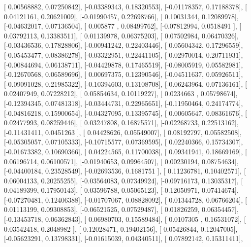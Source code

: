 \documentclass{article}
\begin{document}
       [ 0.00568882,  0.07250842],
       [-0.03389343,  0.18320553],
       [-0.01178357,  0.17188378],
       [ 0.04121161,  0.20621009],
       [-0.01990457,  0.22698766],
       [ 0.10031344,  0.12089978],
       [-0.04632017,  0.07136504],
       [ 0.005877  ,  0.08499762],
       [-0.07812994,  0.0518491 ],
       [ 0.03792113,  0.13383511],
       [ 0.01139978,  0.06375203],
       [ 0.07502984,  0.06470326],
       [-0.03436536,  0.17828806],
       [-0.00941242,  0.22403446],
       [ 0.05604342,  0.17296559],
       [-0.05453477,  0.08386278],
       [-0.03322951,  0.22441105],
       [ 0.02970014,  0.20711931],
       [-0.00844694,  0.06138711],
       [-0.04429878,  0.17465519],
       [-0.08005919,  0.05582981],
       [-0.12670568,  0.06589696],
       [ 0.00697375,  0.12390546],
       [-0.04511637,  0.05926511],
       [-0.09091028,  0.21985322],
       [-0.10394603,  0.13108708],
       [-0.06243964,  0.07136161],
       [ 0.02407949,  0.07228212],
       [ 0.05854634,  0.10119227],
       [ 0.0234663 ,  0.05798674],
       [-0.12394345,  0.07481318],
       [-0.03444731,  0.22965651],
       [-0.11950464,  0.24174774],
       [-0.04816218,  0.15900654],
       [-0.04327095,  0.13395745],
       [ 0.00605647,  0.08361676],
       [ 0.02477993,  0.08259446],
       [ 0.03247808,  0.16875571],
       [-0.02268733,  0.22513162],
       [-0.11431411,  0.0451263 ],
       [ 0.04428626,  0.05549007],
       [ 0.08192797,  0.05582508],
       [-0.05305057,  0.07105333],
       [-0.10715577,  0.07369595],
       [ 0.02240366,  0.15734307],
       [-0.01673382,  0.10690366],
       [ 0.04224565,  0.11700038],
       [ 0.09341941,  0.18669169],
       [ 0.06196714,  0.06100571],
       [-0.01940653,  0.09964507],
       [ 0.00230194,  0.08754634],
       [-0.04400184,  0.23528549],
       [-0.02693536,  0.1681751 ],
       [ 0.11236781,  0.10402571],
       [ 0.06004133,  0.20255255],
       [-0.03564083,  0.07349924],
       [-0.09716173,  0.13035317],
       [ 0.04189399,  0.17950143],
       [ 0.03596788,  0.05065123],
       [-0.12050971,  0.07414674],
       [-0.07270481,  0.12406388],
       [-0.01707067,  0.08828092],
       [ 0.01344728,  0.06766204],
       [ 0.01113199,  0.09308853],
       [-0.06521525,  0.07529487],
       [ 0.01826259,  0.06354457],
       [-0.13453718,  0.06362843],
       [ 0.06980703,  0.15589484],
       [ 0.0107305 ,  0.16531072],
       [ 0.03542418,  0.2048982 ],
       [ 0.12028471,  0.19402156],
       [ 0.05426844,  0.12047005],
       [-0.05623291,  0.13798331],
       [-0.01615039,  0.04340511],
       [ 0.07892142,  0.15311411],
\end{document}
